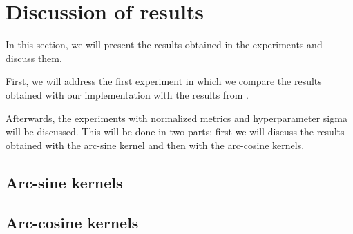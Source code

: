 \chapter{Discussion of results}
\label{sec:analysis}

In this section, we will present the results obtained in the experiments
and discuss them.

First, we will address the first experiment in which we compare the results
obtained with our implementation with the results from
\textcite{frenayParameterinsensitiveKernelExtreme2011}.

Afterwards, the experiments with normalized metrics and hyperparameter sigma
will be discussed. This will be done in two parts: first we will discuss the
results obtained with the arc-sine kernel and then with the arc-cosine kernels.



\pagebreak
\section{Arc-sine kernels}



\pagebreak
\section{Arc-cosine kernels}


% 

